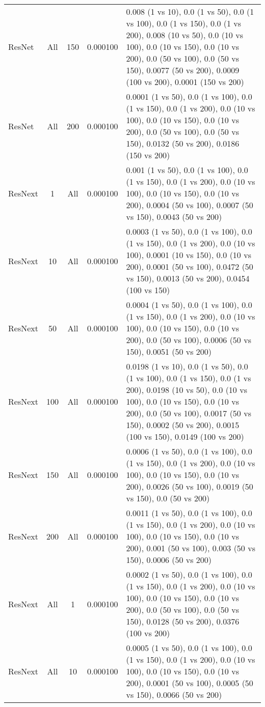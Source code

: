 \begin{tabular}{|l|c|c|c|p{7cm}|}
ResNet & All & 150 & 0.000100 & 0.008 (1 vs 10), 0.0 (1 vs 50), 0.0 (1 vs 100), 0.0 (1 vs 150), 0.0 (1 vs 200), 0.008 (10 vs 50), 0.0 (10 vs 100), 0.0 (10 vs 150), 0.0 (10 vs 200), 0.0 (50 vs 100), 0.0 (50 vs 150), 0.0077 (50 vs 200), 0.0009 (100 vs 200), 0.0001 (150 vs 200) \\
ResNet & All & 200 & 0.000100 & 0.0001 (1 vs 50), 0.0 (1 vs 100), 0.0 (1 vs 150), 0.0 (1 vs 200), 0.0 (10 vs 100), 0.0 (10 vs 150), 0.0 (10 vs 200), 0.0 (50 vs 100), 0.0 (50 vs 150), 0.0132 (50 vs 200), 0.0186 (150 vs 200) \\
ResNext & 1 & All & 0.000100 & 0.001 (1 vs 50), 0.0 (1 vs 100), 0.0 (1 vs 150), 0.0 (1 vs 200), 0.0 (10 vs 100), 0.0 (10 vs 150), 0.0 (10 vs 200), 0.0004 (50 vs 100), 0.0007 (50 vs 150), 0.0043 (50 vs 200) \\
ResNext & 10 & All & 0.000100 & 0.0003 (1 vs 50), 0.0 (1 vs 100), 0.0 (1 vs 150), 0.0 (1 vs 200), 0.0 (10 vs 100), 0.0001 (10 vs 150), 0.0 (10 vs 200), 0.0001 (50 vs 100), 0.0472 (50 vs 150), 0.0013 (50 vs 200), 0.0454 (100 vs 150) \\
ResNext & 50 & All & 0.000100 & 0.0004 (1 vs 50), 0.0 (1 vs 100), 0.0 (1 vs 150), 0.0 (1 vs 200), 0.0 (10 vs 100), 0.0 (10 vs 150), 0.0 (10 vs 200), 0.0 (50 vs 100), 0.0006 (50 vs 150), 0.0051 (50 vs 200) \\
ResNext & 100 & All & 0.000100 & 0.0198 (1 vs 10), 0.0 (1 vs 50), 0.0 (1 vs 100), 0.0 (1 vs 150), 0.0 (1 vs 200), 0.0198 (10 vs 50), 0.0 (10 vs 100), 0.0 (10 vs 150), 0.0 (10 vs 200), 0.0 (50 vs 100), 0.0017 (50 vs 150), 0.0002 (50 vs 200), 0.0015 (100 vs 150), 0.0149 (100 vs 200) \\
ResNext & 150 & All & 0.000100 & 0.0006 (1 vs 50), 0.0 (1 vs 100), 0.0 (1 vs 150), 0.0 (1 vs 200), 0.0 (10 vs 100), 0.0 (10 vs 150), 0.0 (10 vs 200), 0.0026 (50 vs 100), 0.0019 (50 vs 150), 0.0 (50 vs 200) \\
ResNext & 200 & All & 0.000100 & 0.0011 (1 vs 50), 0.0 (1 vs 100), 0.0 (1 vs 150), 0.0 (1 vs 200), 0.0 (10 vs 100), 0.0 (10 vs 150), 0.0 (10 vs 200), 0.001 (50 vs 100), 0.003 (50 vs 150), 0.0006 (50 vs 200) \\
ResNext & All & 1 & 0.000100 & 0.0002 (1 vs 50), 0.0 (1 vs 100), 0.0 (1 vs 150), 0.0 (1 vs 200), 0.0 (10 vs 100), 0.0 (10 vs 150), 0.0 (10 vs 200), 0.0 (50 vs 100), 0.0 (50 vs 150), 0.0128 (50 vs 200), 0.0376 (100 vs 200) \\
ResNext & All & 10 & 0.000100 & 0.0005 (1 vs 50), 0.0 (1 vs 100), 0.0 (1 vs 150), 0.0 (1 vs 200), 0.0 (10 vs 100), 0.0 (10 vs 150), 0.0 (10 vs 200), 0.0001 (50 vs 100), 0.0005 (50 vs 150), 0.0066 (50 vs 200) \\

\end{tabular}

